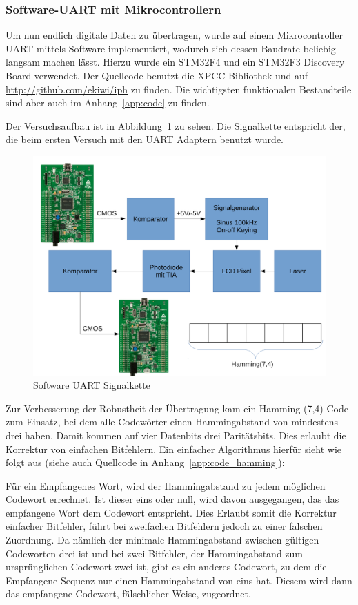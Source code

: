 \documentclass[12pt,a4paper]{article}
\begin{document}
\subsubsection{Software-UART mit Mikrocontrollern}
Um nun endlich digitale Daten zu übertragen, wurde auf einem Mikrocontroller UART mittels Software implementiert, wodurch sich dessen Baudrate beliebig langsam machen lässt. Hierzu wurde ein STM32F4 und ein STM32F3 Discovery Board verwendet. Der Quellcode benutzt die XPCC Bibliothek und auf \url{http://github.com/ekiwi/iph} zu finden. Die wichtigsten funktionalen Bestandteile sind aber auch im Anhang~\ref{app:code} zu finden.

Der Versuchsaufbau ist in Abbildung~\ref{fig:sotware_uart_signal_chain} zu sehen. Die Signalkette entspricht der, die beim ersten Versuch mit den UART Adaptern benutzt wurde.

\begin{figure}[H]
  \centering
  \includegraphics[width=\textwidth]{img/software_uart.pdf}
  \caption{Software UART Signalkette}
  \label{fig:sotware_uart_signal_chain}
\end{figure}

Zur Verbesserung der Robustheit der Übertragung kam ein Hamming (7,4) Code zum Einsatz, bei dem alle Codewörter einen Hammingabstand von mindestens drei haben. Damit kommen auf vier Datenbits drei Paritätsbits. Dies erlaubt die Korrektur von einfachen Bitfehlern. Ein einfacher Algorithmus hierfür sieht wie folgt aus (siehe auch Quellcode in Anhang~\ref{app:code_hamming}):

Für ein Empfangenes Wort, wird der Hammingabstand zu jedem möglichen Codewort errechnet. Ist dieser eins oder null, wird davon ausgegangen, das das empfangene Wort dem Codewort entspricht. Dies Erlaubt somit die Korrektur einfacher Bitfehler, führt bei zweifachen Bitfehlern jedoch zu einer falschen Zuordnung. Da nämlich der minimale Hammingabstand zwischen gültigen Codeworten drei ist und bei zwei Bitfehler, der Hammingabstand zum ursprünglichen Codewort zwei ist, gibt es ein anderes Codewort, zu dem die Empfangene Sequenz nur einen Hammingabstand von eins hat. Diesem wird dann das empfangene Codewort, fälschlicher Weise, zugeordnet.
\end{document}
